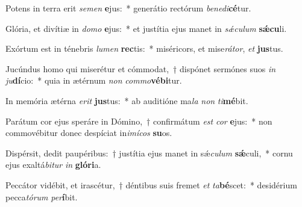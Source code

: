 \item Potens in terra erit \textit{se}\textit{men} \textbf{e}jus:~* generátio rectórum \textit{be}\textit{ne}\textit{di}\textbf{cé}tur.
\item Glória, et divítiæ in \textit{do}\textit{mo} \textbf{e}jus:~* et justítia ejus manet in \textit{sǽ}\textit{cu}\textit{lum} \textbf{sǽ}\textbf{cu}li.
\item Exórtum est in ténebris \textit{lu}\textit{men} \textbf{rec}tis:~* miséricors, et mise\textit{rá}\textit{tor}, \textit{et} \textbf{jus}tus.
\item Jucúndus homo qui miserétur et cómmodat,~† dispónet sermónes suos \textit{in} \textit{ju}\textbf{dí}cio:~* quia in ætérnum \textit{non} \textit{com}\textit{mo}\textbf{vé}\textbf{bi}tur.
\item In memória ætérna \textit{e}\textit{rit} \textbf{jus}tus:~* ab auditióne ma\textit{la} \textit{non} \textit{ti}\textbf{mé}bit.
\item Parátum cor ejus speráre in Dómino,~† confirmátum \textit{est} \textit{cor} \textbf{e}jus:~* non commovébitur donec despíciat in\textit{i}\textit{mí}\textit{cos} \textbf{su}os.
\item Dispérsit, dedit paupéribus:~† justítia ejus manet in sǽ\textit{cu}\textit{lum} \textbf{sǽ}culi,~* cornu ejus exaltá\textit{bi}\textit{tur} \textit{in} \textbf{gló}\textbf{ri}a.
\item Peccátor vidébit, et irascétur,~† déntibus suis fremet \textit{et} \textit{ta}\textbf{bé}scet:~* desidérium pecca\textit{tó}\textit{rum} \textit{per}\textbf{í}bit.
